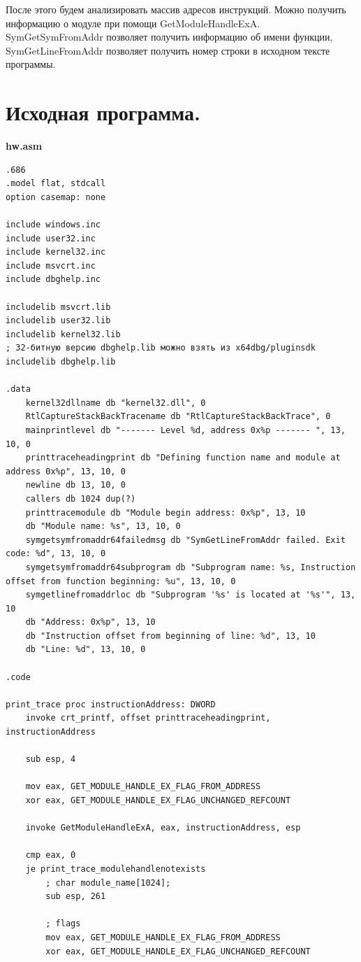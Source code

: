 \documentclass[a4paper,14pt]{extarticle}
\begin{document}
После этого будем анализировать массив адресов инструкций. Можно получить информацию о 
модуле при помощи GetModuleHandleExA. SymGetSymFromAddr позволяет получить
информацию об имени функции, SymGetLineFromAddr позволяет получить номер строки в 
исходном тексте программы.

\section{Исходная программа.}
\textbf{hw.asm}
\begin{verbatim}
.686
.model flat, stdcall
option casemap: none

include windows.inc
include user32.inc
include kernel32.inc
include msvcrt.inc
include dbghelp.inc

includelib msvcrt.lib
includelib user32.lib 
includelib kernel32.lib 
; 32-битную версию dbghelp.lib можно взять из x64dbg/pluginsdk
includelib dbghelp.lib

.data
	kernel32dllname db "kernel32.dll", 0
	RtlCaptureStackBackTracename db "RtlCaptureStackBackTrace", 0
	mainprintlevel db "------- Level %d, address 0x%p ------- ", 13, 10, 0
	printtraceheadingprint db "Defining function name and module at address 0x%p", 13, 10, 0
	newline db 13, 10, 0
	callers db 1024 dup(?)
	printtracemodule db "Module begin address: 0x%p", 13, 10
	db "Module name: %s", 13, 10, 0
	symgetsymfromaddr64failedmsg db "SymGetLineFromAddr failed. Exit code: %d", 13, 10, 0
	symgetsymfromaddr64subprogram db "Subprogram name: %s, Instruction offset from function beginning: %u", 13, 10, 0
	symgetlinefromaddrloc db "Subprogram '%s' is located at '%s'", 13, 10
	db "Address: 0x%p", 13, 10
	db "Instruction offset from beginning of line: %d", 13, 10
	db "Line: %d", 13, 10, 0

.code

print_trace proc instructionAddress: DWORD
    invoke crt_printf, offset printtraceheadingprint, instructionAddress

	sub esp, 4

	mov eax, GET_MODULE_HANDLE_EX_FLAG_FROM_ADDRESS
	xor eax, GET_MODULE_HANDLE_EX_FLAG_UNCHANGED_REFCOUNT

	invoke GetModuleHandleExA, eax, instructionAddress, esp

	cmp eax, 0
	je print_trace_modulehandlenotexists
		; char module_name[1024];
		sub esp, 261

		; flags
		mov eax, GET_MODULE_HANDLE_EX_FLAG_FROM_ADDRESS
		xor eax, GET_MODULE_HANDLE_EX_FLAG_UNCHANGED_REFCOUNT
		

\end{verbatim}
\end{document}
